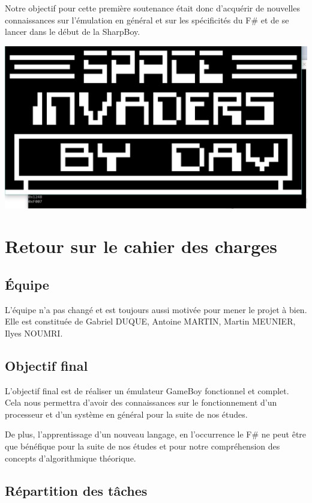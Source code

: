 \documentclass[12pt, a4paper]{article}
\begin{document}
\medskip
Notre objectif pour cette première soutenance était donc d'acquérir de nouvelles connaissances sur l'émulation en général et sur les spécificités du F\# et de se lancer dans le début de la SharpBoy.

\bigskip
\bigskip
\begin{center}
\includegraphics[width=14cm]{chip8cap3.PNG}
\end{center}

\pagebreak

\section{Retour sur le cahier des charges}
\subsection{Équipe}
L'équipe n'a pas changé et est toujours aussi motivée pour mener le projet à bien. Elle est constituée de Gabriel DUQUE, Antoine MARTIN, Martin MEUNIER, Ilyes NOUMRI.
\subsection{Objectif final}
L'objectif final est de réaliser un émulateur GameBoy fonctionnel et complet. Cela nous permettra d'avoir des connaissances sur le fonctionnement d'un processeur et d'un système en général pour la suite de nos études. 

De plus, l'apprentissage d'un nouveau langage, en l'occurrence le F\# ne peut être que bénéfique pour la suite de nos études et pour notre compréhension des concepts d'algorithmique théorique.
\bigskip
\subsection{Répartition des tâches}
\bigskip
\bigskip
\end{document}
